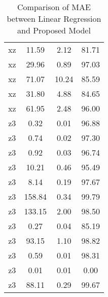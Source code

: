 \begin{table}[h]
\begin{tabular}{|c|c|c|c|}
        xz & 11.59 & 2.12 & 81.71 \\
        xz & 29.96 & 0.89 & 97.03 \\
        xz & 71.07 & 10.24 & 85.59 \\
        xz & 31.80 & 4.88 & 84.65 \\
        xz & 61.95 & 2.48 & 96.00 \\
        z3 & 0.32 & 0.01 & 96.88 \\
        z3 & 0.74 & 0.02 & 97.30 \\
        z3 & 0.92 & 0.03 & 96.74 \\
        z3 & 10.21 & 0.46 & 95.49 \\
        z3 & 8.14 & 0.19 & 97.67 \\
        z3 & 158.84 & 0.34 & 99.79 \\
        z3 & 133.15 & 2.00 & 98.50 \\
        z3 & 0.27 & 0.04 & 85.19 \\
        z3 & 93.15 & 1.10 & 98.82 \\
        z3 & 0.59 & 0.01 & 98.31 \\
        z3 & 0.01 & 0.01 & 0.00 \\
        z3 & 88.11 & 0.29 & 99.67 \\
        \hline
    \end{tabular}
    \caption{Comparison of MAE between Linear Regression and Proposed Model}
    \label{tab:mae}
\end{table}


